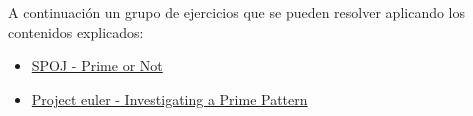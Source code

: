 A continuación un grupo de ejercicios que se pueden resolver aplicando los contenidos explicados:

\begin{itemize}
	\item \href{https://www.spoj.com/problems/PON/}{SPOJ - Prime or Not}
	\item \href{https://projecteuler.net/problem=146}{Project euler - Investigating a Prime Pattern}
\end{itemize}
